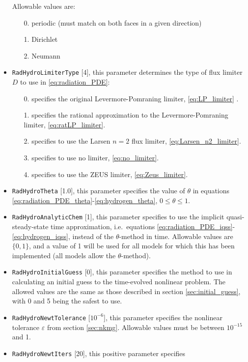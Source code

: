 \documentclass[letterpaper,10pt]{article}
\renewcommand{\(}{\left(}
\renewcommand{\)}{\right)}
\begin{document}
\begin{itemize}
  Allowable values are:
  \begin{itemize}
  \item[0.] periodic (must match on both faces in a given direction)
  \item[1.] Dirichlet
  \item[2.] Neumann
  \end{itemize}
\item {\tt RadHydroLimiterType} [4], this parameter determines the
  type of flux limiter $D$ to use in \eqref{eq:radiation_PDE}:
  \begin{itemize}
  \item[0.] specifies the original Levermore-Pomraning limiter,
    \eqref{eq:LP_limiter} \cite{Levermore1984,LevermorePomraning1981}.
  \item[1.] specifies the rational approximation to the
    Levermore-Pomraning limiter, \eqref{eq:ratLP_limiter}.
  \item[2.] specifies to use the Larsen $n=2$ flux limiter,
    \eqref{eq:Larsen_n2_limiter}. 
  \item[3.] specifies to use no limiter, \eqref{eq:no_limiter}.
  \item[4.] specifies to use the ZEUS limiter, \eqref{eq:Zeus_limiter}.
  \end{itemize}
\item {\tt RadHydroTheta} [1.0], this parameter specifies the
  value of $\theta$ in equations
  \eqref{eq:radiation_PDE_theta}-\eqref{eq:hydrogen_theta},
  $0\le\theta\le 1$.
\item {\tt RadHydroAnalyticChem} [1], this parameter specifies to use
  the implicit quasi-steady-state time approximation, i.e.~equations
  \eqref{eq:radiation_PDE_iqss}-\eqref{eq:hydrogen_iqss}, instead of
  the $\theta$-method in time.  Allowable values are $\{0,1\}$, and a
  value of 1 will be used for all models for which this has been
  implemented (all models allow the $\theta$-method).
\item {\tt RadHydroInitialGuess} [0], this parameter specifies the
  method to use in calculating an initial guess to the time-evolved
  nonlinear problem.  The allowed values are the same as those
  described in section \ref{sec:initial_guess}, with 0 and 5 being the
  safest to use.
\item {\tt RadHydroNewtTolerance} [$10^{-6}$], this parameter
  specifies the nonlinear tolerance $\varepsilon$ from section
  \ref{sec:nkmg}.  Allowable values must be between $10^{-15}$ and 1.
\item {\tt RadHydroNewtIters} [20], this positive parameter specifies

\end{itemize}
\end{document}
